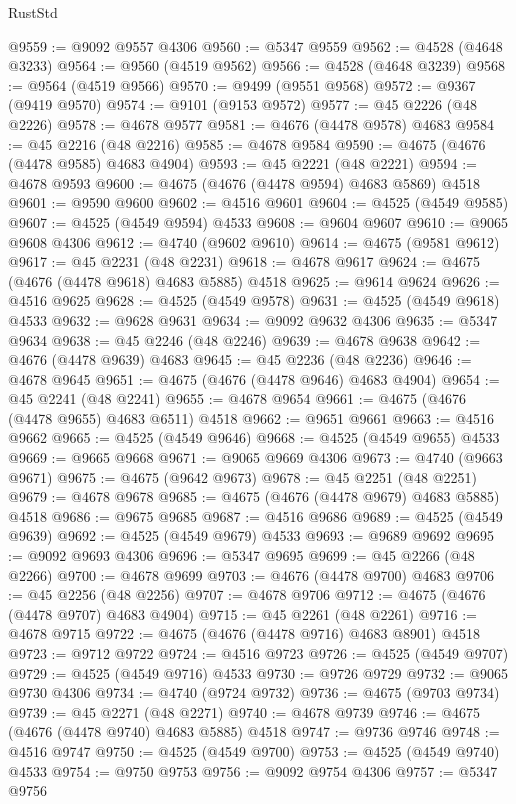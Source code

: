 \begin{lexlean}{RustStd}
\begin{coremodule}
@9559 := @9092 @9557 @4306
@9560 := @5347 @9559
@9562 := @4528 (@4648 @3233)
@9564 := @9560 (@4519 @9562)
@9566 := @4528 (@4648 @3239)
@9568 := @9564 (@4519 @9566)
@9570 := @9499 (@9551 @9568)
@9572 := @9367 (@9419 @9570)
@9574 := @9101 (@9153 @9572)
@9577 := @45 @2226 (@48 @2226)
@9578 := @4678 @9577
@9581 := @4676 (@4478 @9578) @4683
@9584 := @45 @2216 (@48 @2216)
@9585 := @4678 @9584
@9590 := @4675 (@4676 (@4478 @9585) @4683 @4904)
@9593 := @45 @2221 (@48 @2221)
@9594 := @4678 @9593
@9600 := @4675 (@4676 (@4478 @9594) @4683 @5869) @4518
@9601 := @9590 @9600
@9602 := @4516 @9601
@9604 := @4525 (@4549 @9585)
@9607 := @4525 (@4549 @9594) @4533
@9608 := @9604 @9607
@9610 := @9065 @9608 @4306
@9612 := @4740 (@9602 @9610)
@9614 := @4675 (@9581 @9612)
@9617 := @45 @2231 (@48 @2231)
@9618 := @4678 @9617
@9624 := @4675 (@4676 (@4478 @9618) @4683 @5885) @4518
@9625 := @9614 @9624
@9626 := @4516 @9625
@9628 := @4525 (@4549 @9578)
@9631 := @4525 (@4549 @9618) @4533
@9632 := @9628 @9631
@9634 := @9092 @9632 @4306
@9635 := @5347 @9634
@9638 := @45 @2246 (@48 @2246)
@9639 := @4678 @9638
@9642 := @4676 (@4478 @9639) @4683
@9645 := @45 @2236 (@48 @2236)
@9646 := @4678 @9645
@9651 := @4675 (@4676 (@4478 @9646) @4683 @4904)
@9654 := @45 @2241 (@48 @2241)
@9655 := @4678 @9654
@9661 := @4675 (@4676 (@4478 @9655) @4683 @6511) @4518
@9662 := @9651 @9661
@9663 := @4516 @9662
@9665 := @4525 (@4549 @9646)
@9668 := @4525 (@4549 @9655) @4533
@9669 := @9665 @9668
@9671 := @9065 @9669 @4306
@9673 := @4740 (@9663 @9671)
@9675 := @4675 (@9642 @9673)
@9678 := @45 @2251 (@48 @2251)
@9679 := @4678 @9678
@9685 := @4675 (@4676 (@4478 @9679) @4683 @5885) @4518
@9686 := @9675 @9685
@9687 := @4516 @9686
@9689 := @4525 (@4549 @9639)
@9692 := @4525 (@4549 @9679) @4533
@9693 := @9689 @9692
@9695 := @9092 @9693 @4306
@9696 := @5347 @9695
@9699 := @45 @2266 (@48 @2266)
@9700 := @4678 @9699
@9703 := @4676 (@4478 @9700) @4683
@9706 := @45 @2256 (@48 @2256)
@9707 := @4678 @9706
@9712 := @4675 (@4676 (@4478 @9707) @4683 @4904)
@9715 := @45 @2261 (@48 @2261)
@9716 := @4678 @9715
@9722 := @4675 (@4676 (@4478 @9716) @4683 @8901) @4518
@9723 := @9712 @9722
@9724 := @4516 @9723
@9726 := @4525 (@4549 @9707)
@9729 := @4525 (@4549 @9716) @4533
@9730 := @9726 @9729
@9732 := @9065 @9730 @4306
@9734 := @4740 (@9724 @9732)
@9736 := @4675 (@9703 @9734)
@9739 := @45 @2271 (@48 @2271)
@9740 := @4678 @9739
@9746 := @4675 (@4676 (@4478 @9740) @4683 @5885) @4518
@9747 := @9736 @9746
@9748 := @4516 @9747
@9750 := @4525 (@4549 @9700)
@9753 := @4525 (@4549 @9740) @4533
@9754 := @9750 @9753
@9756 := @9092 @9754 @4306
@9757 := @5347 @9756

\end{coremodule}
\end{lexlean}
